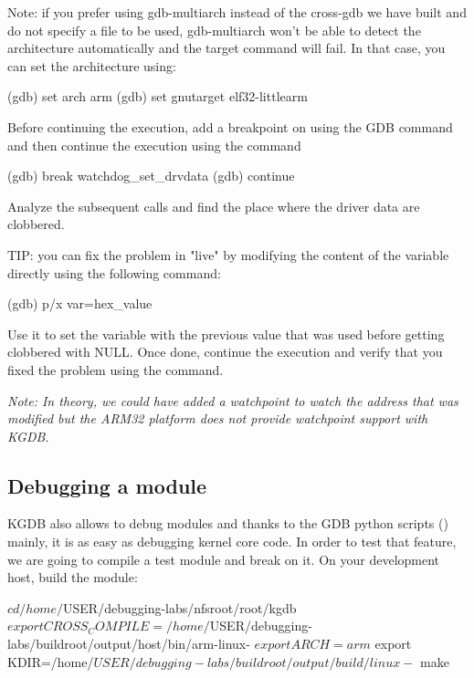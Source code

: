 Note: if you prefer using gdb-multiarch instead of the cross-gdb we have
built and do not specify a file to be used, gdb-multiarch won't be able to
detect the architecture automatically and the target command will fail. In
that case, you can set the architecture using:

\begin{bashinput}
(gdb) set arch arm
(gdb) set gnutarget elf32-littlearm
\end{bashinput}

Before continuing the execution, add a breakpoint on
 using the  GDB command and then
continue the execution using the  command

\begin{bashinput}
(gdb) break watchdog_set_drvdata
(gdb) continue
\end{bashinput}

Analyze the subsequent calls and find the place where the driver data are
clobbered.

TIP: you can fix the problem in "live" by modifying the content of the
 variable directly using the following command:

\begin{bashinput}
(gdb) p/x var=hex_value
\end{bashinput}

Use it to set the variable with the previous value that was used before getting
clobbered with NULL. Once done, continue the execution and verify that you fixed
the problem using the  command.

{\em Note: In theory, we could have added a watchpoint to watch the address that
was modified but the ARM32 platform does not provide watchpoint support with
KGDB.}

\subsection{Debugging a module}

KGDB also allows to debug modules and thanks to the GDB python scripts
() mainly, it is as easy as debugging kernel core code. In
order to test that feature, we are going to compile a test module and break on
it. On your development host, build the module:

\begin{bashinput}
$ cd /home/$USER/debugging-labs/nfsroot/root/kgdb
$ export CROSS_COMPILE=/home/$USER/debugging-labs/buildroot/output/host/bin/arm-linux-
$ export ARCH=arm
$ export KDIR=/home/$USER/debugging-labs/buildroot/output/build/linux-%
$ make
\end{bashinput}

